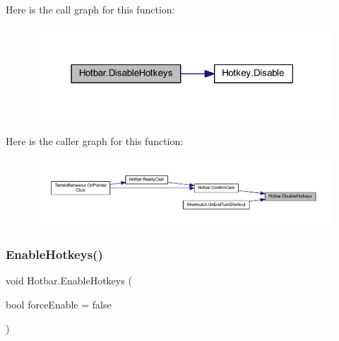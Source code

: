 Here is the call graph for this function\+:\nopagebreak
\begin{figure}[H]
\begin{center}
\leavevmode
\includegraphics[width=315pt]{class_hotbar_a914ca0c61c4d64b0bde6e829064f71a9_cgraph}
\end{center}
\end{figure}
Here is the caller graph for this function\+:\nopagebreak
\begin{figure}[H]
\begin{center}
\leavevmode
\includegraphics[width=350pt]{class_hotbar_a914ca0c61c4d64b0bde6e829064f71a9_icgraph}
\end{center}
\end{figure}
\mbox{\label{class_hotbar_a37bca03a1dfd144a30bae3774eaab667}} 
\subsubsection{\texorpdfstring{EnableHotkeys()}{EnableHotkeys()}}
{\footnotesize\ttfamily void Hotbar.\+Enable\+Hotkeys (\begin{DoxyParamCaption}\item[{bool}]{force\+Enable = {\ttfamily false} }\end{DoxyParamCaption})}

